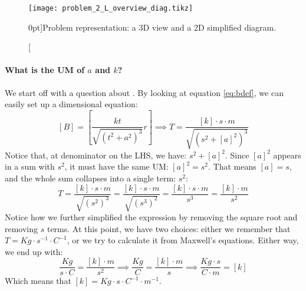 \begin{figure}
    \texttt{[image: problem\_2\_L\_overview\_diag.tikz]}
    \caption[Problem representation.][0pt]{Problem representation: a 3D view and a 2D
    simplified diagram.}%
    \label{fig:capacitorovervw}%
\end{figure}

\paragraph[Problem 1]{What is the UM of $a$ and $k$?}
\label{par:subp1}
We start off with a question
about . By looking at equation \ref{eq:bdef}, we can
easily set up a dimensional equation:
\begin{equation*}
    \left[ B \right] = \left[ \frac{k t}{\sqrt{\left( t^2 + a^2 \right)^3}} r \right] \implies
    \unit{T} = \frac{[k] \cdot \unit{s} \cdot \unit{m}}{\sqrt{\left( \unit{s}^2 + [a]^2 \right)^3}}
\end{equation*}
Notice that, at denominator on the LHS, we have: $s^2 + [a]^2$. Since $[a]^2$
appears in a sum with $s^2$, it must have the same UM: $[a]^2 = s^2$.
That means $[a] = \unit{s}$, and the whole sum collapses into a single term: $s^2$:
\begin{equation*}
    \unit{T} = \frac{[k] \cdot \unit{s} \cdot \unit{m}}{\sqrt{\left( \unit{s}^2 \right)^3}} = 
    \frac{[k] \cdot \unit{s} \cdot \unit{m}}{\sqrt{\left( \unit{s}^3 \right)^2}} = 
    \frac{[k] \cdot \unit{s} \cdot \unit{m}}{\unit{s}^3} =
    \frac{[k] \cdot \unit{m}}{\unit{s}^2}
\end{equation*}
Notice how we further simplified the expression by removing the square root and removing
$\unit{s}$ terms. At this point, we have two choices: either we remember that
$T=\unit{Kg} \cdot \unit{s}^{-1} \cdot \unit{C}^{-1}$, or we try to calculate it from
Maxwell's
equations.
Either way, we end up with:
\begin{equation*}
    \frac{\unit{Kg}}{\unit{s} \cdot \unit{C}} = \frac{[k] \cdot \unit{m}}{\unit{s}^2} \implies
    \frac{\unit{Kg}}{\unit{C}} = \frac{[k] \cdot \unit{m}}{\unit{s}} \implies
    \frac{\unit{Kg} \cdot \unit{s}}{\unit{C} \cdot \unit{m}} = [k]
\end{equation*}
Which means that $[k] = \unit{Kg} \cdot \unit{s} \cdot \unit{C}^{-1} \cdot \unit{m}^{-1}$.

